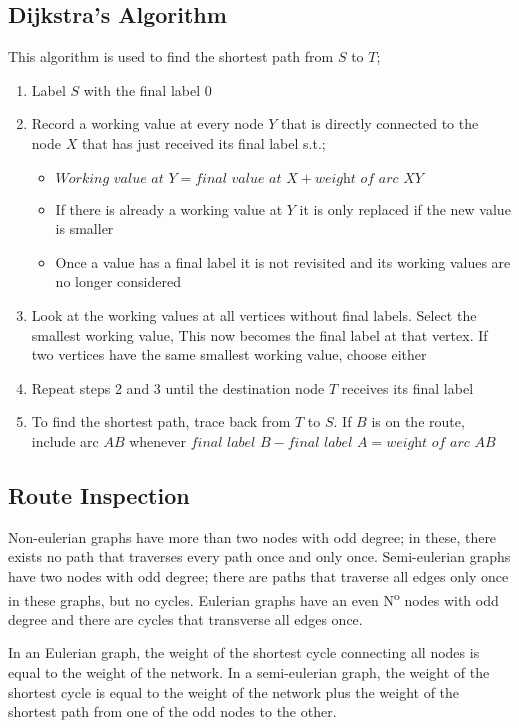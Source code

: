 \documentclass{article}
\begin{document}
\subsection{Dijkstra's Algorithm}
This algorithm is used to find the shortest path from $S$ to $T$;\begin{enumerate}
	\item Label $S$ with the final label 0
	\item Record a working value at every node $Y$ that is directly connected to the node $X$ that has just received its final label s.t.;\begin{itemize}
			\item $\textit{Working value at }Y=\textit{final value at }X+\textit{weight of arc XY}$
			\item If there is already a working value at $Y$ it is only replaced if the new value is smaller
			\item Once a value has a final label it is not revisited and its working values are no longer considered
		\end{itemize}
	\item Look at the working values at all vertices without final labels. Select the smallest working value, This now becomes the final label at that vertex. If two vertices have the same smallest working value, choose either
	\item Repeat steps 2 and 3 until the destination node $T$ receives its final label
	\item To find the shortest path, trace back from $T$ to $S$. If $B$ is on the route, include arc $AB$ whenever $\textit{final label }B-\textit{final label }A=\textit{weight of arc }AB$
\end{enumerate}

\subsection{Route Inspection}
Non-eulerian graphs have more than two nodes with odd degree; in these, there exists no path that traverses every path once and only once. Semi-eulerian graphs have two nodes with odd degree; there are paths that traverse all edges only once in these graphs, but no cycles. Eulerian graphs have an even N\textsuperscript{o} nodes with odd degree and there are cycles that transverse all edges once.

In an Eulerian graph, the weight of the shortest cycle connecting all nodes is equal to the weight of the network. In a semi-eulerian graph, the weight of the shortest cycle is equal to the weight of the network plus the weight of the shortest path from one of the odd nodes to the other.
\end{document}
